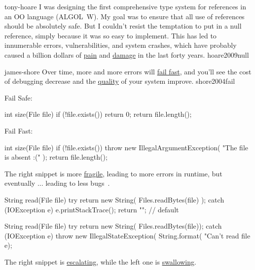 \documentclass{article}
\begin{document}

\lnQuote
  {tony-hoare}
  {I was designing the first comprehensive type system for references in an OO language (ALGOL~W). My goal was to ensure that all use of references should be absolutely safe. But I couldn't resist the temptation to put in a null reference, simply because it was so easy to implement. This has led to innumerable errors, vulnerabilities, and system crashes, which have probably caused a billion dollars of \ul{pain} and \ul{damage} in the last forty years.}
  {hoare2009null}

\pptToc


\lnQuote
  {james-shore}
  {Over time, more and more errors will \ul{fail fast}, and you'll see the cost of debugging decrease and the \ul{quality} of your system improve.}
  {shore2004fail}

\begin{pptWide}{2}
Fail Safe:\par
{\small\begin{ffcode}
int size(File file) {
  if (!file.exists()) {
    return 0;
  }
  return file.length();
}
\end{ffcode}
}
\par\columnbreak\par
Fail Fast:\par
{\small\begin{ffcode}
int size(File file) {
  if (!file.exists()) {
    throw new IllegalArgumentException(
      "The file is absent :("
    );
  }
  return file.length();
}
\end{ffcode}
}
\end{pptWide}
\par
The right snippet is more \ul{fragile}, leading to more errors in runtime, but eventually ... leading to less bugs~\citep{bugayenko2015blog0825}.
\plush{}

\begin{pptWide}{2}
{\small\begin{ffcode}
String read(File file) {
  try {
    return new String(
      Files.readBytes(file)
    );
  } catch (IOException e) {
    e.printStackTrace();
    return ""; // default
  }
}
\end{ffcode}
}
\par\columnbreak\par
{\small\begin{ffcode}
String read(File file) {
  try {
    return new String(
      Files.readBytes(file));
  } catch (IOException e) {
    throw new IllegalStateException(
      String.format(
        "Can't read file %
      e);
  }
}
\end{ffcode}
}
\end{pptWide}
\par
The right snippet is \ul{escalating}, while the left one is \ul{swallowing}.
\plush{}
\end{document}

